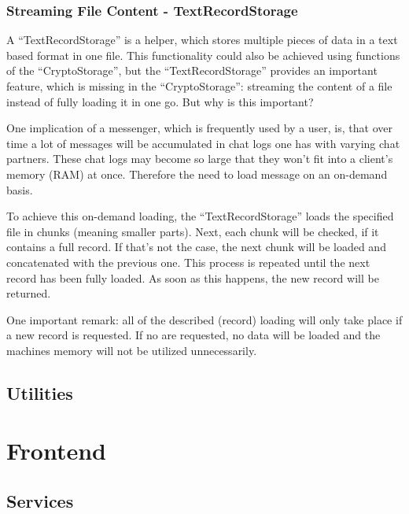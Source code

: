 \subsubsection{Streaming File Content - TextRecordStorage}
A \enquote{TextRecordStorage} is a helper, which stores multiple pieces of data in a text based format in one file.
This functionality could also be achieved using functions of the \enquote{CryptoStorage}, but the \enquote{TextRecordStorage} provides an important feature, which is missing in the \enquote{CryptoStorage}: streaming the content of a file instead of fully loading it in one go.
But why is this important?

One implication of a messenger, which is frequently used by a user, is, that over time a lot of messages will be accumulated in chat logs one has with varying chat partners.
These chat logs may become so large that they won't fit into a client's memory (RAM) at once.
Therefore the need to load message on an on-demand basis.

To achieve this on-demand loading, the \enquote{TextRecordStorage} loads the specified file in chunks (meaning smaller parts).
Next, each chunk will be checked, if it contains a full record.
If that's not the case, the next chunk will be loaded and concatenated with the previous one.
This process is repeated until the next record has been fully loaded.
As soon as this happens, the new record will be returned.

One important remark: all of the described (record) loading will only take place if a new record is requested.
If no are requested, no data will be loaded and the machines memory will not be utilized unnecessarily.

\subsection{Utilities}\label{subsec:utilities}

\section{Frontend}\label{sec:frontend}

\subsection{Services}\label{subsec:services}

